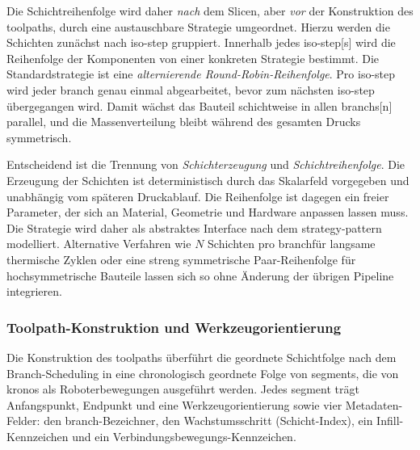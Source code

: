                 Die Schichtreihenfolge wird daher \emph{nach} dem Slicen, aber \emph{vor} der Konstruktion des \glspl{toolpath}, durch eine austauschbare Strategie umgeordnet.
                Hierzu werden die Schichten zunächst nach \gls{iso-step} gruppiert.
                Innerhalb jedes \gls{iso-step}[s] wird die Reihenfolge der Komponenten von einer konkreten Strategie bestimmt.
                Die Standardstrategie ist eine \emph{alternierende Round-Robin-Reihenfolge}.
                Pro \gls{iso-step} wird jeder \gls{branch} genau einmal abgearbeitet, bevor zum nächsten \gls{iso-step} übergegangen wird.
                Damit wächst das Bauteil schichtweise in allen \glspl{branch}[n] parallel, und die Massenverteilung bleibt während des gesamten Drucks symmetrisch.

                Entscheidend ist die Trennung von \emph{Schichterzeugung} und \emph{Schichtreihenfolge}.
                Die Erzeugung der Schichten ist deterministisch durch das Skalarfeld vorgegeben und unabhängig vom späteren Druckablauf.
                Die Reihenfolge ist dagegen ein freier Parameter, der sich an Material, Geometrie und Hardware anpassen lassen muss.
                Die Strategie wird daher als abstraktes Interface nach dem \gls{strategy-pattern} modelliert.
                Alternative Verfahren wie \glqq $N$ Schichten pro \gls{branch}\grqq für langsame thermische Zyklen oder eine streng symmetrische Paar-Reihenfolge für hochsymmetrische Bauteile lassen sich so ohne Änderung der übrigen Pipeline integrieren.

            \subsubsection{Toolpath-Konstruktion und Werkzeugorientierung}\label{subsubsec:concept-crystal-tool-orientation} 
                Die Konstruktion des \glspl{toolpath} überführt die geordnete Schichtfolge nach dem Branch-Scheduling in eine chronologisch geordnete Folge von \glspl{segment}, die von \ac{kronos} als Roboterbewegungen ausgeführt werden.
                Jedes \gls{segment} trägt Anfangspunkt, Endpunkt und eine Werkzeugorientierung sowie vier Metadaten-Felder: den \gls{branch}-Bezeichner, den Wachstumsschritt (Schicht-Index), ein Infill-Kennzeichen und ein Verbindungsbewegungs-Kennzeichen.


